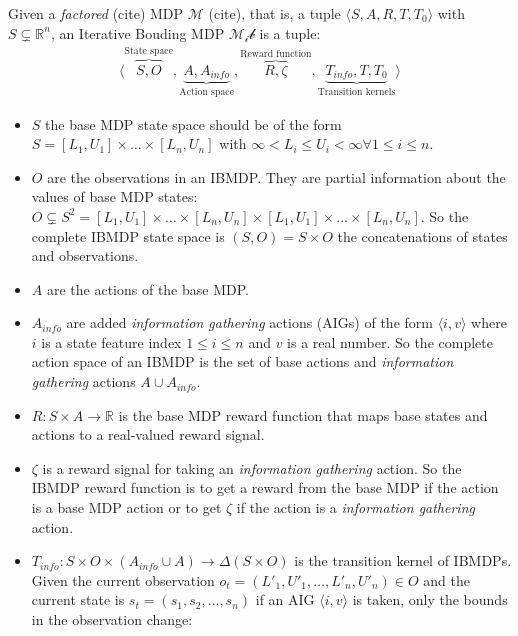 \begin{definition}
Given a \textit{factored} (cite) MDP $\mathcal{M}$ (cite), that is, a tuple $\langle S, A, R, T, T_0 \rangle$ with $S\subsetneq \mathbb{R}^n$, an Iterative Bouding MDP $\mathcal{M_ib}$ is a tuple:
\begin{align*}
    \langle \overbrace{S, O}^{\text{State space}}, \underbrace{A, A_{info}}_{\text{Action space}}, \overbrace{R, \zeta}^{\text{Reward function}}, \underbrace{T_{info}, T, T_0}_{\text{Transition kernels}}\rangle
\end{align*}

\begin{itemize}
\item $S$ the base MDP state space should be of the form $S = [L_1, U_1]\times \dots \times [L_n, U_n]$ with $\infty < L_i \leq U_i < \infty \forall 1\leq i\leq n$.
\item $O$ are the observations in an IBMDP. They are partial information about the values of base MDP states: $O\subsetneq S^2 =  [L_1, U_1]\times \dots \times [L_n, U_n] \times [L_1, U_1]\times \dots \times [L_n, U_n]$. So the complete IBMDP state space is $(S, O) = S \times O$ the concatenations of states and observations.
\item $A$ are the actions of the base MDP.
\item $A_{info}$ are added \textit{information gathering} actions (AIGs) of the form $\langle i, v \rangle$ where $i$ is a state feature index $1 \leq i \leq n$ and $v$ is a real number. So the complete action space of an IBMDP is the set of base actions and \textit{information gathering} actions $A \cup A_{info}$.
\item $R: S\times A \rightarrow \mathbb{R}$ is the base MDP reward function that maps base states and actions to a real-valued reward signal.
\item $\zeta$ is a reward signal for taking an \textit{information gathering} action. So the IBMDP reward function is to get a reward from the base MDP if the action is a base MDP action or to get $\zeta$ if the action is a \textit{information gathering} action.
\item $T_{info}: S\times O \times( A_{info} \cup A )\rightarrow \Delta (S\times O)$ is the transition kernel of IBMDPs. 
Given the current observation $o_{t} = (L'_1, U'_1, \dots, L'_n, U'_n)\in O$ and the current state is $s_t=(s_1, s_2, \dots, s_n)$ if an AIG $\langle i, v \rangle$ is taken, only the bounds in the observation change:
\begin{align*}

\end{align*}
\end{itemize}
\end{definition}
